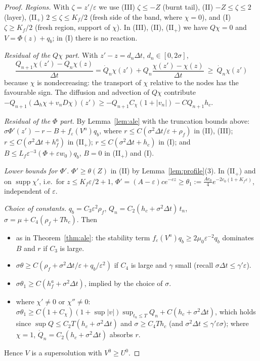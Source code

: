 \documentclass[11pt]{amsart}
\theoremstyle{remark}
\newcommand{\ve}{\varepsilon}
\begin{document}
\begin{proof}
\emph{Regions.} With $\zeta=z'/\ve$ we use
(III) $\zeta\le-Z$ (burnt tail), (II) $-Z\le\zeta\le2$ (layer),
(II$_+$) $2\le\zeta\le K_f/2$ (fresh side of the band, where $\chi=0$),
and (I) $\zeta\ge K_f/2$ (fresh region, support of $\chi$). In (III), (II),
(II$_+$) we have $Q\chi=0$ and $V=\Phi(z)+q_b$; in (I) there is no reaction.

\emph{Residual of the $Q\chi$ part.} With $z'-z=d_n\Delta t$, $d_n\in[0,2\sigma]$,
\[
\frac{Q_{n+1}\chi(z')-Q_n\chi(z)}{\Delta t}=\dot Q_n\chi(z')+Q_n\frac{\chi(z')-\chi(z)}{\Delta t}\ \ge\ \dot Q_n\chi(z')
\]
because $\chi$ is nondecreasing: the transport of $\chi$ relative to the nodes
has the favourable sign. The diffusion and advection of $Q\chi$ contribute
$-Q_{n+1}(\Delta_h\chi+v_nD\chi)(z')\ge-Q_{n+1}C_\chi(1+|v_n|)-CQ_{n+1}h_c$.

\emph{Residual of the $\Phi$ part.} By Lemma~\ref{lem:ale} with the truncation
bounds above: $\sigma\Phi'(z')-r-B+f_\ve(V^n)q_{b}$, where
$r\le C(\sigma^2\Delta t/\ve+\rho_f)$ in (II), (III);
$r\le C(\sigma^2\Delta t+h_f^a)$ in (II$_+$); $r\le C(\sigma^2\Delta t+h_c)$ in (I);
and $B\le L_f\ve^{-3}(\Phi+\ve w_0)q_b$, $B=0$ in (II$_+$) and (I).

\emph{Lower bounds for $\Phi'$.} $\Phi'\ge\theta(Z)$ in (II) by
Lemma~\ref{lem:profile}(3). In (II$_+$) and on $\operatorname{supp}\chi'$, i.e.\
for $z\le K_f\ve/2+1$, $\Phi'=(A-\ve)ce^{-cz}\ge\theta_1:=\frac{Ac_0}{4}e^{-2c_0(1+K_f\ve)}$,
independent of $\ve$.

\emph{Choice of constants.} $q_b=C_3\ve^2\rho_f$,
$Q_n=C_2(h_c+\sigma^2\Delta t)\,t_n$, $\sigma=\mu+C_4(\rho_f+Th_c)$. Then
\begin{itemize}
\item[(III)] as in Theorem~\ref{thm:ale}: the stability term
$f_\ve(V^n)q_b\ge2\mu_0\ve^{-2}q_b$ dominates $B$ and $r$ if $C_3$ is large.
\item[(II)] $\sigma\theta\ge C(\rho_f+\sigma^2\Delta t/\ve+q_b/\ve^2)$ if $C_4$ is
large and $\gamma$ small (recall $\sigma\Delta t\le\gamma'\ve$).
\item[(II$_+$)] $\sigma\theta_1\ge C(h_f^a+\sigma^2\Delta t)$, implied by the choice of $\sigma$.
\item[(I)] where $\chi'\ne0$ or $\chi''\ne0$:
$\sigma\theta_1\ge C(1+C_\chi)(1+\sup|v|)\sup_{t_n\le T}Q_n+C(h_c+\sigma^2\Delta t)$,
which holds since $\sup Q\le C_2T(h_c+\sigma^2\Delta t)$ and $\sigma\ge C_4Th_c$
(and $\sigma^2\Delta t\le\gamma'\ve\sigma$); where $\chi=1$,
$\dot Q_n=C_2(h_c+\sigma^2\Delta t)$ absorbs $r$.
\end{itemize}
Hence $V$ is a supersolution with $V^0\ge U^0$.


\end{proof}
\end{document}
